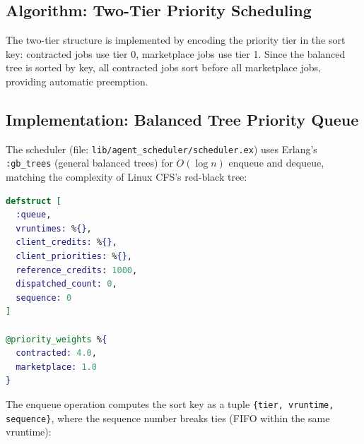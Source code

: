 \documentclass[12pt,a4paper]{article}
\theoremstyle{definition}
\theoremstyle{remark}
\begin{document}
\subsection{Algorithm: Two-Tier Priority Scheduling}

\begin{algorithm}[H]
\caption{Credit-Weighted Agent Scheduling}\label{alg:scheduling}
\SetAlgoLined
{}
\BlankLine
{}
\end{algorithm}

The two-tier structure is implemented by encoding the priority tier in the sort key: contracted jobs use tier 0, marketplace jobs use tier 1. Since the balanced tree is sorted by key, all contracted jobs sort before all marketplace jobs, providing automatic preemption.

\subsection{Implementation: Balanced Tree Priority Queue}

The scheduler (file: \texttt{lib/agent\_scheduler/scheduler.ex}) uses Erlang's \texttt{:gb\_trees} (general balanced trees) for $O(\log n)$ enqueue and dequeue, matching the complexity of Linux CFS's red-black tree:

\begin{lstlisting}[language=elixir, caption={Scheduler state and priority queue (from \texttt{scheduler.ex})}, label={lst:scheduler}]
defstruct [
  :queue,
  vruntimes: %{},
  client_credits: %{},
  client_priorities: %{},
  reference_credits: 1000,
  dispatched_count: 0,
  sequence: 0
]

@priority_weights %{
  contracted: 4.0,
  marketplace: 1.0
}
\end{lstlisting}

The enqueue operation computes the sort key as a tuple \texttt{\{tier, vruntime, sequence\}}, where the sequence number breaks ties (FIFO within the same vruntime):
\end{document}
